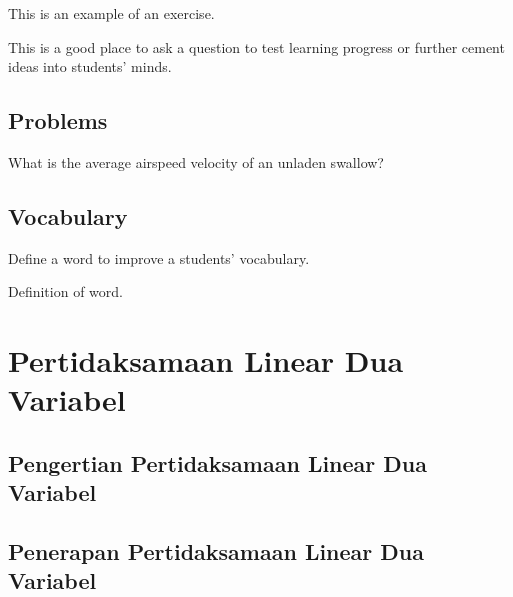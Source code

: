 \documentclass[11pt,fleqn]{book} %
\begin{document}
This is an example of an exercise.

\begin{exercise}
This is a good place to ask a question to test learning progress or further cement ideas into students' minds.
\end{exercise}


\section{Problems}

\begin{problem}
What is the average airspeed velocity of an unladen swallow?
\end{problem}


\section{Vocabulary}

Define a word to improve a students' vocabulary.

\begin{vocabulary}[Word]
Definition of word.
\end{vocabulary}


\chapter{Pertidaksamaan Linear Dua Variabel}

\section{Pengertian Pertidaksamaan Linear Dua Variabel}

\section{Penerapan Pertidaksamaan Linear Dua Variabel}
\end{document}
